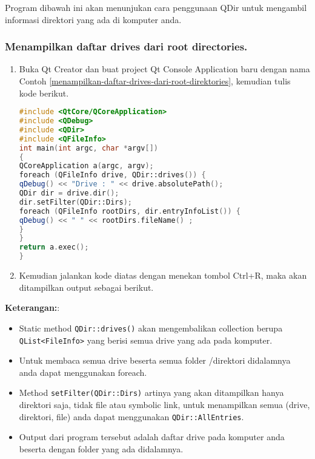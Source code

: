 Program dibawah ini akan menunjukan cara penggunaan QDir untuk mengambil
informasi direktori yang ada di komputer anda.

\subsubsection*{Menampilkan daftar drives dari root directories.}

\begin{enumerate}

\item
  Buka Qt Creator dan buat project Qt Console Application baru dengan
  nama Contoh \ref{menampilkan-daftar-drives-dari-root-direktories}, kemudian tulis kode berikut.

\begin{lstlisting}[language=c++, caption=Menampilkan daftar drives dari root directories., label=menampilkan-daftar-drives-dari-root-direktories]
#include <QtCore/QCoreApplication>
#include <QDebug>
#include <QDir>
#include <QFileInfo>
int main(int argc, char *argv[])
{
QCoreApplication a(argc, argv);
foreach (QFileInfo drive, QDir::drives()) {
qDebug() << "Drive : " << drive.absolutePath();
QDir dir = drive.dir();
dir.setFilter(QDir::Dirs);
foreach (QFileInfo rootDirs, dir.entryInfoList()) {
qDebug() << " " << rootDirs.fileName() ;
}
}
return a.exec();
}
\end{lstlisting}
\item
  Kemudian jalankan kode diatas dengan menekan tombol Ctrl+R, maka akan
  ditampilkan output sebagai berikut.
\end{enumerate}

\textbf{Keterangan:}:

\begin{itemize}

\item
  Static method \texttt{QDir::drives()} akan mengembalikan collection
  berupa \texttt{QList\textless{}FileInfo\textgreater{}} yang berisi
  semua drive yang ada pada komputer.
\item
  Untuk membaca semua drive beserta semua folder /direktori didalamnya
  anda dapat menggunakan foreach.
\item
  Method \texttt{setFilter(QDir::Dirs)} artinya yang akan ditampilkan
  hanya direktori saja, tidak file atau symbolic link, untuk menampilkan
  semua (drive, direktori, file) anda dapat menggunakan
  \texttt{QDir::AllEntries}.
\item
  Output dari program tersebut adalah daftar drive pada komputer anda
  beserta dengan folder yang ada didalamnya.
\end{itemize}

